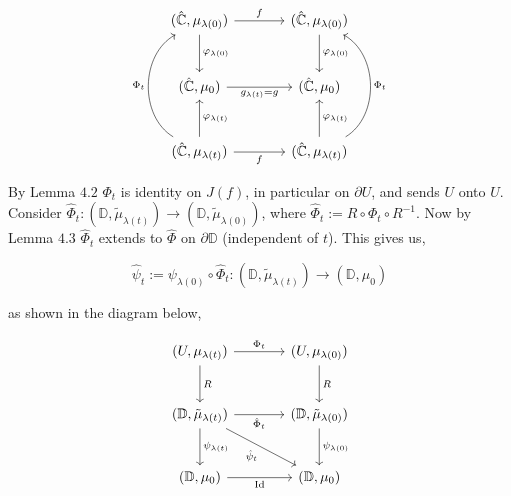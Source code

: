 \documentclass[11pt,a4paper]{article}
\begin{document}
        $$\begin{tikzcd}[column sep = large, row sep = large]
        (\hat{\mathbb{C}}, \mu_{\lambda(0)})
        \arrow[r, "f"]
        \arrow[d, "\phi_{\lambda(0)}"]
        &
        (\hat{\mathbb{C}}, \mu_{\lambda(0)})
        \arrow[d, "\phi_{\lambda(0)}"]
        \\
        (\hat{\mathbb{C}}, \mu_0)
        \arrow[r, "g_{\lambda(t)} = g"']
        &
        (\hat{\mathbb{C}}, \mu_0)
        \\
        (\hat{\mathbb{C}}, \mu_{\lambda(t)})
        \arrow[r, "f"']
        \arrow[u, "\phi_{\lambda(t)}"']
        \arrow[uu, bend left = 60, "\Phi_t"]
        &
        (\hat{\mathbb{C}}, \mu_{\lambda(t)})
        \arrow[u, "\phi_{\lambda(t)}"']
        \arrow[uu, bend right = 60, "\Phi_t"']
        \end{tikzcd}$$


        By Lemma $4.2$ $\Phi_t$ is identity on $J(f)$, in particular on $\partial U$, and sends $U$ onto $U$. Consider $\hat{\Phi}_t: (\mathbb{D}, \tilde{\mu}_{\lambda(t)}) \rightarrow (\mathbb{D}, \tilde{\mu}_{\lambda(0)})$, where $\hat{\Phi}_t := R\circ \Phi_t\circ R^{-1}$. Now by Lemma $4.3$ $\hat{\Phi}_t$ extends to $\hat{\Phi}$ on $\partial \mathbb{D}$ (independent of $t$). This gives us,

        $$\hat{\psi}_t := \psi_{\lambda(0)}\circ \hat{\Phi}_t: (\mathbb{D}, \tilde{\mu}_{\lambda(t)}) \rightarrow (\mathbb{D}, \mu_0)$$


        as shown in the diagram below,

        $$\begin{tikzcd}[column sep = large, row sep = large]
        (U, \mu_{\lambda(t)})
        \arrow[r, "\Phi_t"]
        \arrow[d, "R"]
        &
        (U, \mu_{\lambda(0)})
        \arrow[d, "R"]
        \\
        (\mathbb{D}, \tilde{\mu}_{\lambda(t)})
        \arrow[r, "\hat{\Phi}_t"']
        \arrow[d, "\psi_{\lambda(t)}"]
        \arrow[dr, "\hat{\psi}_t"']
        &
        (\mathbb{D}, \tilde{\mu}_{\lambda(0)})
        \arrow[d, "\psi_{\lambda(0)}"]
        \\
        (\mathbb{D}, \mu_0)
        \arrow[r, "\text{Id}"']
        &
        (\mathbb{D}, \mu_0)
        \end{tikzcd}$$
\end{document}

